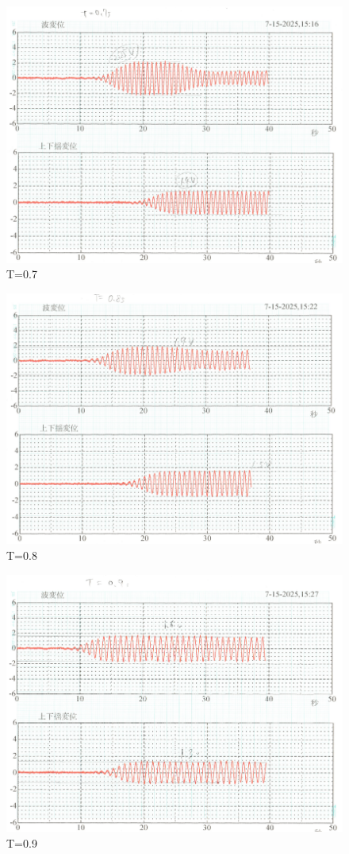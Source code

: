\documentclass[dvipdfmx,a4paper]{jreport} %
\begin{document}
\begin{figure}[H]
    \centering
    \includegraphics[width=0.9\linewidth]{summer/ship-experiment/2d-pool/pictures/t0.7.png}
    \caption{T=0.7}
    \label{fig:t0.7}
\end{figure}
\begin{figure}[H]
    \centering
    \includegraphics[width=0.9\linewidth]{summer/ship-experiment/2d-pool/pictures/t0.8.png}
    \caption{T=0.8}
    \label{fig:t0.8}
\end{figure}
\begin{figure}[H]
    \centering
    \includegraphics[width=0.9\linewidth]{summer/ship-experiment/2d-pool/pictures/t0.9.png}
    \caption{T=0.9}
    \label{fig:t0.9}
\end{figure}
\end{document}
